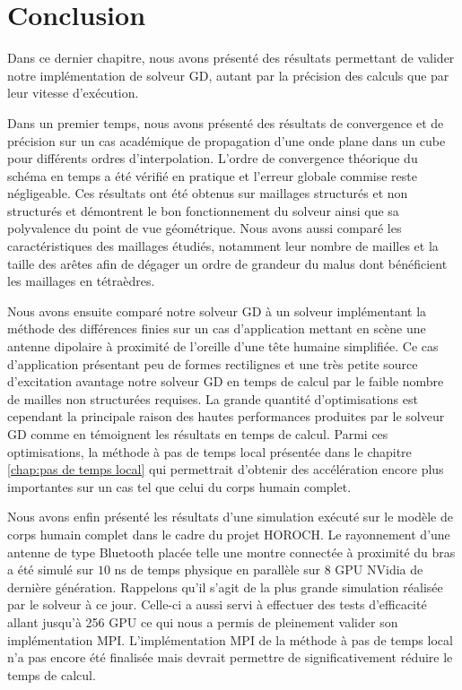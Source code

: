 \section*{Conclusion}


Dans ce dernier chapitre, nous avons présenté des résultats
permettant de valider notre implémentation de solveur GD, autant
par la précision des calculs que par leur vitesse d'exécution.

Dans un premier temps, nous avons présenté des résultats de convergence
et de précision 
sur un cas académique de propagation d'une onde plane dans un cube
pour différents ordres d'interpolation.
L'ordre de convergence théorique du schéma en temps a été vérifié
en pratique et l'erreur globale commise reste négligeable.
Ces résultats ont été obtenus sur maillages structurés et non structurés
et démontrent le bon fonctionnement du solveur ainsi que sa
polyvalence du point de vue géométrique.
Nous avons aussi comparé les caractéristiques des maillages
étudiés, notamment leur nombre de mailles et la taille
des arêtes afin de dégager un ordre de grandeur du malus
dont bénéficient les maillages en tétraèdres.


Nous avons ensuite comparé notre solveur GD à un solveur implémentant
la méthode des différences finies sur un cas d'application
mettant en scène une antenne dipolaire à proximité de l'oreille d'une tête
humaine simplifiée.
Ce cas d'application présentant peu de formes rectilignes
et une très petite source d'excitation
avantage notre solveur GD en temps de calcul par le faible nombre
de mailles non structurées requises. La grande quantité
d'optimisations est cependant la principale raison
des hautes performances produites par le solveur GD comme en témoignent
les résultats en temps de calcul.
Parmi ces optimisations, la méthode à pas de temps local
présentée dans le chapitre \ref{chap:pas de temps local}
qui permettrait d'obtenir des accélération encore plus importantes
sur un cas tel que celui du corps humain complet.


Nous avons enfin présenté les résultats d'une simulation exécuté
sur le modèle de corps humain complet dans le cadre du projet HOROCH.
Le rayonnement d'une antenne de type Bluetooth placée telle
une montre connectée à proximité du bras a été simulé sur $10$ ns de
temps physique en parallèle sur 8 GPU NVidia de dernière génération.
Rappelons qu'il s'agit de la plus grande simulation réalisée par le solveur
à ce jour. Celle-ci a aussi servi à effectuer des tests d'efficacité allant
jusqu'à 256 GPU ce qui nous a permis de pleinement valider son implémentation MPI.
L'implémentation MPI de la méthode à pas de temps local
n'a pas encore été finalisée mais devrait permettre de significativement
réduire le temps de calcul.



